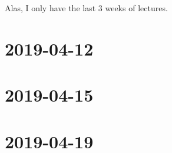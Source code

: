 \documentclass{ccg-notes}
\author{Colton~Grainger}
\date{\today}
\begin{document}
\frontstuff

Alas, I only have the last 3 weeks of lectures.

\section{2019-04-12}
    

\section{2019-04-15}
    

%     

\section{2019-04-19}
    
\end{document}

